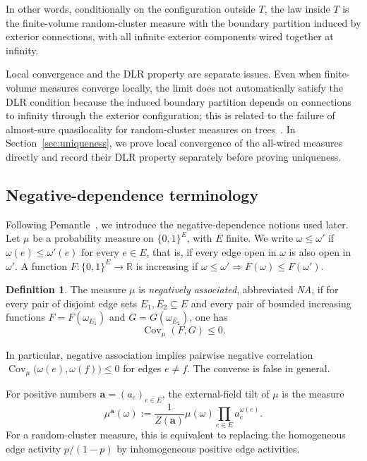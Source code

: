 \documentclass[11pt]{amsart}
\theoremstyle{plain}
\theoremstyle{definition}
\newtheorem{definition}[theorem]{Definition}
\theoremstyle{remark}
\begin{document}
In other words, conditionally on the configuration outside $T$, the law inside $T$ is the finite-volume random-cluster measure with the boundary partition induced by exterior connections, with all infinite exterior components wired together at infinity.

Local convergence and the DLR property are separate issues. Even when finite-volume measures converge locally, the limit does not automatically satisfy the DLR condition because the induced boundary partition depends on connections to infinity through the exterior configuration; this is related to the failure of almost-sure quasilocality for random-cluster measures on trees~\cite{haggstrom1996quasilocality}. In Section~\ref{sec:uniqueness}, we prove local convergence of the all-wired measures directly and record their DLR property separately before proving uniqueness.

\subsection{Negative-dependence terminology}

Following Pemantle~\cite{pemantle2000towards}, we introduce the negative-dependence notions used later. Let $\mu$ be a probability measure on $\{0,1\}^E$, with $E$ finite. We write $\omega\le\omega'$ if $\omega(e)\le\omega'(e)$ for every $e\in E$, that is, if every edge open in $\omega$ is also open in $\omega'$. A function $F:\{0,1\}^E\to\mathbb R$ is increasing if $\omega\le\omega' \Longrightarrow F(\omega)\le F(\omega')$.

\begin{definition}
The measure $\mu$ is \emph{negatively associated}, abbreviated \emph{NA}, if for every pair of disjoint edge sets $E_1,E_2\subseteq E$ and every pair of bounded increasing functions $F=F(\omega_{E_1})$ and $G=G(\omega_{E_2})$, one has
\[
    \operatorname{Cov}_\mu(F,G)
    \le0.
\]
\end{definition}

In particular, negative association implies pairwise negative correlation $\operatorname{Cov}_\mu \bigl(\omega(e),\omega(f)\bigr) \le0$ for edges $e\ne f$. The converse is false in general.

For positive numbers $\mathbf a=(a_e)_{e\in E}$, the external-field tilt of $\mu$ is the measure
\[
    \mu^{\mathbf a}(\omega)
    :=
    \frac{1}{Z(\mathbf a)}
    \mu(\omega)
    \prod_{e\in E}a_e^{\omega(e)}.
\]
For a random-cluster measure, this is equivalent to replacing the homogeneous edge activity $p/(1-p)$ by inhomogeneous positive edge activities.
\end{document}
